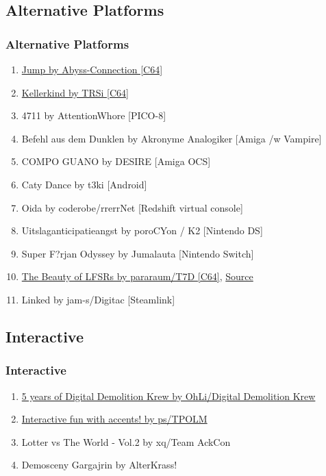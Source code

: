 \documentclass{beamer}
\begin{document}
\subsection{Alternative Platforms}
\begin{frame}
  \frametitle{Alternative Platforms}
  \begin{enumerate}
  \item \href{https://www.pouet.net/prod.php?which=77670}{Jump by Abyss-Connection [C64]}
  \item \href{https://www.pouet.net/prod.php?which=77701}{Kellerkind by TRSi [C64]}
  \item 4711 by AttentionWhore [PICO-8]
  \item Befehl aus dem Dunklen by Akronyme Analogiker [Amiga /w Vampire]
  \item COMPO GUANO by DESIRE [Amiga OCS]
  \item Caty Dance by t3ki [Android]
  \item Oida by coderobe/rrerrNet [Redshift virtual console]
  \item Uitslaganticipatieangst by poroCYon / K2 [Nintendo DS]
  \item Super F?rjan Odyssey by Jumalauta [Nintendo Switch]
  \item \href{https://csdb.dk/release/?id=167237}{The Beauty of LFSRs by pararaum/T7D [C64]}, \href{https://github.com/pararaum/beauty_of_LFSR}{Source}
  \item Linked by jam-s/Digitac [Steamlink]
  \end{enumerate}
\end{frame}


\subsection{Interactive}
\begin{frame}
  \frametitle{Interactive}
  \begin{enumerate}
  \item \href{https://demozoo.org/productions/191979/}{5 years of Digital Demolition Krew by OhLi/Digital Demolition Krew}
  \item \href{https://www.twitch.tv/videos/298895783?t=04h11m30s}{Interactive fun with accents! by ps/TPOLM}
  \item Lotter vs The World - Vol.2 by xq/Team AckCon
  \item Demosceny Gargajrin by AlterKrass!
  \end{enumerate}
\end{frame}
\end{document}
